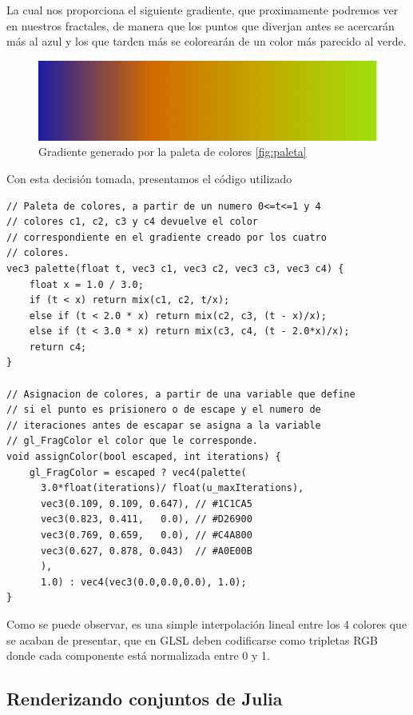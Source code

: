 La cual nos proporciona el siguiente gradiente, que proximamente podremos ver en nuestros fractales, de manera que los puntos que diverjan antes se acercarán más al azul y los que tarden más se colorearán de un color más parecido al verde.

\begin{figure} [ht]
    \centering
    \includegraphics[scale = 0.51]{img/C6/gradiente.png}
    \caption{Gradiente generado por la paleta de colores \ref{fig:paleta}}
    \label{fig:gradiente}
\end{figure}

Con esta decisión tomada, presentamos el código utilizado

\begin{lstlisting}
// Paleta de colores, a partir de un numero 0<=t<=1 y 4 
// colores c1, c2, c3 y c4 devuelve el color 
// correspondiente en el gradiente creado por los cuatro 
// colores.
vec3 palette(float t, vec3 c1, vec3 c2, vec3 c3, vec3 c4) {
    float x = 1.0 / 3.0;
    if (t < x) return mix(c1, c2, t/x);
    else if (t < 2.0 * x) return mix(c2, c3, (t - x)/x);
    else if (t < 3.0 * x) return mix(c3, c4, (t - 2.0*x)/x);
    return c4;
}

// Asignacion de colores, a partir de una variable que define
// si el punto es prisionero o de escape y el numero de 
// iteraciones antes de escapar se asigna a la variable 
// gl_FragColor el color que le corresponde.
void assignColor(bool escaped, int iterations) {
    gl_FragColor = escaped ? vec4(palette(
      3.0*float(iterations)/ float(u_maxIterations),
      vec3(0.109, 0.109, 0.647), // #1C1CA5
      vec3(0.823, 0.411,   0.0), // #D26900
      vec3(0.769, 0.659,   0.0), // #C4A800
      vec3(0.627, 0.878, 0.043)  // #A0E00B
      ), 
      1.0) : vec4(vec3(0.0,0.0,0.0), 1.0);
}
\end{lstlisting}

Como se puede observar, es una simple interpolación lineal entre los 4 colores que se acaban de presentar, que en GLSL deben codificarse como tripletas RGB donde cada componente está normalizada entre 0 y 1.

\subsection{Renderizando conjuntos de Julia}
\label{subsection:render-julia}

